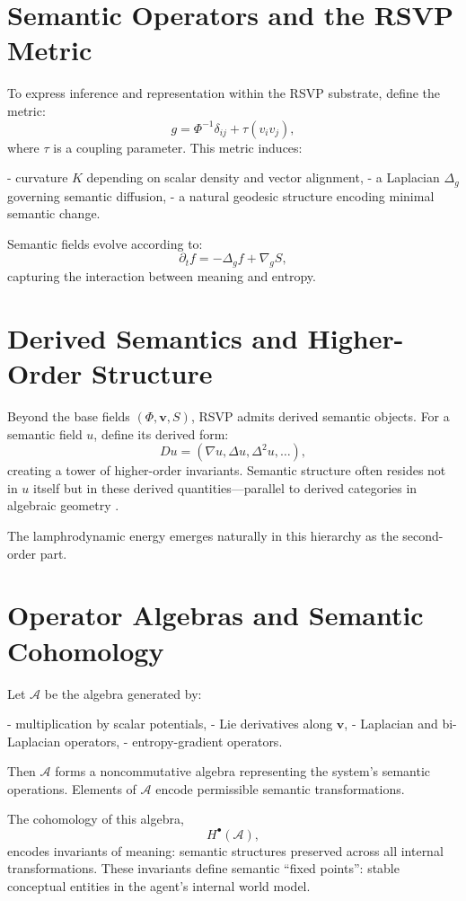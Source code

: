 \documentclass[12pt]{article}
\theoremstyle{plain}
\theoremstyle{definition}
\theoremstyle{remark}
\begin{document}
\section{Semantic Operators and the RSVP Metric}

To express inference and representation within the RSVP substrate, define the
metric:
\[
g = \Phi^{-1} \delta_{ij} + \tau (v_i v_j),
\]
where $\tau$ is a coupling parameter. This metric induces:

- curvature $K$ depending on scalar density and vector alignment,  
- a Laplacian $\Delta_g$ governing semantic diffusion,  
- a natural geodesic structure encoding minimal semantic change.

Semantic fields evolve according to:
\[
\partial_t f = -\Delta_g f + \nabla_g S,
\]
capturing the interaction between meaning and entropy.

\section{Derived Semantics and Higher-Order Structure}

Beyond the base fields $(\Phi,\mathbf{v},S)$, RSVP admits derived semantic
objects. For a semantic field $u$, define its derived form:
\[
Du = (\nabla u, \Delta u, \Delta^2 u, \ldots ),
\]
creating a tower of higher-order invariants. Semantic structure often resides
not in $u$ itself but in these derived quantities—parallel to derived 
categories in algebraic geometry \citep{bredon1997sheaf, connes1994noncommutative}.

The lamphrodynamic energy emerges naturally in this hierarchy as the 
second-order part.

\section{Operator Algebras and Semantic Cohomology}

Let $\mathcal{A}$ be the algebra generated by:

- multiplication by scalar potentials,  
- Lie derivatives along $\mathbf{v}$,  
- Laplacian and bi-Laplacian operators,  
- entropy-gradient operators.

Then $\mathcal{A}$ forms a noncommutative algebra representing the system’s
semantic operations. Elements of $\mathcal{A}$ encode permissible semantic
transformations.

The cohomology of this algebra,
\[
H^\bullet(\mathcal{A}),
\]
encodes invariants of meaning: semantic structures preserved across all 
internal transformations. These invariants define semantic ``fixed points'':
stable conceptual entities in the agent’s internal world model.
\end{document}
